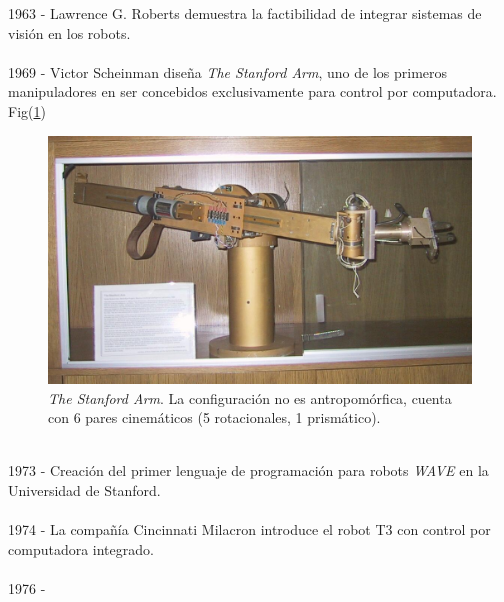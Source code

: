 1963 - Lawrence G. Roberts demuestra la factibilidad de integrar sistemas de visión en los robots.\\\\
1969 - Victor Scheinman diseña \textit{The Stanford Arm}, uno de los primeros manipuladores en ser concebidos exclusivamente para control por computadora. Fig(\ref{stfarm})\\
\begin{figure}[h!]
	\centering
	\includegraphics[scale=0.3]{Capitulo1/figs/StanfordArm.jpg} 
	\caption{\textit{The Stanford Arm}. La configuración no es antropomórfica, cuenta con 6 pares cinemáticos (5 rotacionales, 1 prismático).}
	\label{stfarm}
\end{figure}\\
1973 - Creación del primer lenguaje de programación para robots \textit{WAVE} en la Universidad de Stanford.\\\\
1974 - La compañía Cincinnati Milacron introduce el robot T3 con control por computadora integrado.\\\\
1976 - \\\\
